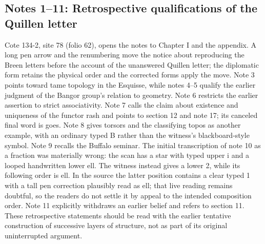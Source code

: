 \subsection*{Notes 1--11: Retrospective qualifications of the Quillen letter}
Cote 134-2, site 78 (folio 62), opens the notes to Chapter I and the appendix. A long pen arrow and the renumbering move the notice about reproducing the Breen letters before the account of the unanswered Quillen letter; the diplomatic form retains the physical order and the corrected forms apply the move. Note 3 points toward tame topology in the Esquisse, while notes 4--5 qualify the earlier judgment of the Bangor group's relation to geometry. Note 6 restricts the earlier assertion to strict associativity. Note 7 calls the claim about existence and uniqueness of the functor rash and points to section 12 and note 17; its canceled final word is goes. Note 8 gives torsors and the classifying topos as another example, with an ordinary typed B rather than the witness's blackboard-style symbol. Note 9 recalls the Buffalo seminar. The initial transcription of note 10 as a fraction was materially wrong: the scan has a star with typed upper i and a looped handwritten lower ell. The witness instead gives a lower 2, while its following order is ell. In the source the latter position contains a clear typed 1 with a tall pen correction plausibly read as ell; that live reading remains doubtful, so the readers do not settle it by appeal to the intended composition order. Note 11 explicitly withdraws an earlier belief and refers to section 11. These retrospective statements should be read with the earlier tentative construction of successive layers of structure, not as part of its original uninterrupted argument.

